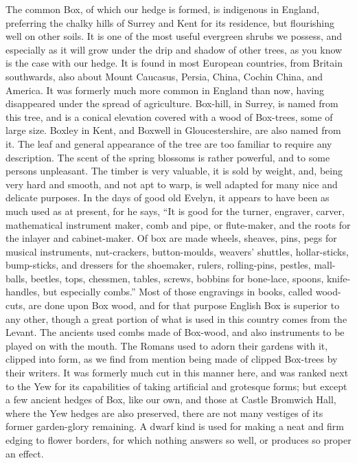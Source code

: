 \documentclass[11pt,twoside]{article}
\begin{document}
The common Box, of which our hedge is formed, is indigenous in England, preferring the chalky hills of Surrey and Kent for its residence, but flourishing well on other soils. It is one of the most useful evergreen shrubs we possess, and especially as it will grow under the drip and shadow of other trees, as you know is the case with our hedge. It is found in most European countries, from Britain southwards, also about Mount Caucasus, Persia, China, Cochin China, and America. It was formerly much more common in England than now, having disappeared under the spread of agriculture. Box-hill, in Surrey, is named from this tree, and is a conical elevation covered with a wood of Box-trees, some of large size. Boxley in Kent, and Boxwell in Gloucestershire, are also named from it. The leaf and general appearance of the tree are too familiar to require any description. The scent of the spring blossoms is rather powerful, and to some persons unpleasant. The timber is very valuable, it is sold by weight, and, being very hard and smooth, and not apt to warp, is well adapted for many nice and delicate purposes. In the days of good old Evelyn, it appears to have been as much used as at present, for he says, “It is good for the turner, engraver, carver, mathematical instrument maker, comb and pipe, or flute-maker, and the roots for the inlayer and cabinet-maker. Of box are made wheels, sheaves, pins, pegs for musical instruments, nut-crackers, button-moulds, weavers’ shuttles, hollar-sticks, bump-sticks, and dressers for the shoemaker, rulers, rolling-pins, pestles, mall-balls, beetles, tops, chessmen, tables, screws, bobbins for bone-lace, spoons, knife-handles, but especially combs.” Most of those engravings in books, called wood-cuts, are done upon Box wood, and for that purpose English Box is superior to any other, though a great portion of what is used in this country comes from the Levant. The ancients used combs made of Box-wood, and also instruments to be played on with the mouth. The Romans used to adorn their gardens with it, clipped into form, as we find from mention being made of clipped Box-trees by their writers. It was formerly much cut in this manner here, and was ranked next to the Yew for its capabilities of taking artificial and grotesque forms; but except a few ancient hedges of Box, like our own, and those at Castle Bromwich Hall, where the Yew hedges are also preserved, there are not many vestiges of its former garden-glory remaining. A dwarf kind is used for making a neat and firm edging to flower borders, for which nothing answers so well, or produces so proper an effect.
\end{document}
